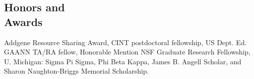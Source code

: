 \documentclass[margin,line]{resume}
\begin{document}
\begin{resume}
    
    \section{\mysidestyle Honors and\\Awards} 

    Addgene Resource Sharing Award, CINT postdoctoral fellowship, US Dept. Ed. GAANN TA/RA fellow, Honorable Mention NSF Graduate Research Fellowship, U. Michigan: Sigma Pi Sigma, Phi Beta Kappa, James B. Angell Scholar, and Sharon Naughton-Briggs Memorial Scholarship.     


\end{resume}
\end{document}
